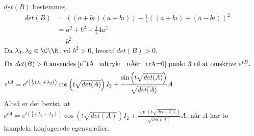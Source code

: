 \begin{bev}
\begin{itemize}
    $det(B)$ bestemmes. 
    \begin{align*}
        det(B) &=\left(\left(a+bi\right)\left(a-bi\right)\right) - \frac{1}{4}\left((a+bi)+(a-bi)\right)^2\\
        &= a^2+b^2-\frac{1}{4}4a^2 \\
        &= b^2
    \end{align*} 
    Da $\lambda_1,\lambda_2\in \C\backslash\R$, vil $b^2>0$, hvoraf $det(B)>0$.
    \begin{align*}
     \intertext{Da $det(B)>0$ anvendes \autoref{e^tA_udtrykt_når_trA=0} punkt 3 til at omskrive $e^{tB}$.}
     e^{tA} &= e^{t\left(\frac{1}{2}(\lambda_1+\lambda_2)\right)} \cos\left(t\sqrt{det(A)}\right)I_2+\frac{\sin\left(t\sqrt{det(A)}\right)}{\sqrt{det(A)}}A
     \end{align*}
    Altså er det bevist, at $e^{tA} = e^{t\left(\frac{1}{2}(\lambda_1+\lambda_2)\right)} \cos\left(t\sqrt{det(A)}\right)I_2+\frac{\sin\left(t\sqrt{det(A)}\right)}{\sqrt{det(A)}}A$, når $A$ har to kompleks konjugerede egenværdier. 
\end{itemize}
\end{bev}